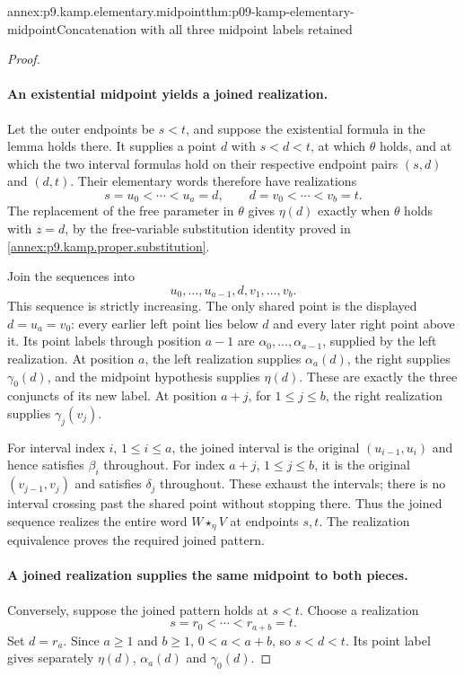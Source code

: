 \begin{annexitem}{annex:p9.kamp.elementary.midpoint}{thm:p09-kamp-elementary-midpoint}{Concatenation with all three midpoint labels retained}
\begin{proof}
\paragraph{An existential midpoint yields a joined realization.}
Let the outer endpoints be \(s<t\), and suppose the existential
formula in the lemma holds there. It supplies a point \(d\) with
\(s<d<t\), at which \(\theta\) holds, and at which the two interval
formulas hold on their respective endpoint pairs \((s,d)\) and
\((d,t)\). Their elementary words therefore have realizations
\[
      s=u_0<\cdots<u_a=d,\qquad
      d=v_0<\cdots<v_b=t.
\]
The replacement of the free parameter in \(\theta\) gives
\(\eta(d)\) exactly when \(\theta\) holds with \(z=d\), by the
free-variable substitution identity proved in
\cref{annex:p9.kamp.proper.substitution}.

Join the sequences into
\[
               u_0,\ldots,u_{a-1},d,v_1,\ldots,v_b.
\]
This sequence is strictly increasing. The only shared point is the
displayed \(d=u_a=v_0\): every earlier left point lies below \(d\)
and every later right point above it. Its point labels through position
\(a-1\) are \(\alpha_0,\ldots,\alpha_{a-1}\), supplied by the
left realization. At position \(a\), the left realization supplies
\(\alpha_a(d)\), the right supplies \(\gamma_0(d)\), and the
midpoint hypothesis supplies \(\eta(d)\). These are exactly the
three conjuncts of its new label. At position \(a+j\), for
\(1\leq j\leq b\), the right realization supplies \(\gamma_j(v_j)\).

For interval index \(i\), \(1\leq i\leq a\), the joined interval
is the original \((u_{i-1},u_i)\) and hence satisfies \(\beta_i\)
throughout. For index \(a+j\), \(1\leq j\leq b\), it is the
original \((v_{j-1},v_j)\) and satisfies \(\delta_j\) throughout.
These exhaust the intervals; there is no interval crossing past the
shared point without stopping there. Thus the joined sequence realizes
the entire word \(W\mathbin{\star_\eta}V\) at endpoints \(s,t\).
The realization equivalence proves the required joined pattern.

\paragraph{A joined realization supplies the same midpoint to both pieces.}
Conversely, suppose the joined pattern holds at \(s<t\). Choose a
realization
\[
                         s=r_0<\cdots<r_{a+b}=t.
\]
Set \(d=r_a\). Since \(a\geq1\) and \(b\geq1\),
\(0<a<a+b\), so \(s<d<t\). Its point label gives separately
\(\eta(d)\), \(\alpha_a(d)\) and \(\gamma_0(d)\).


\end{proof}
\end{annexitem}
